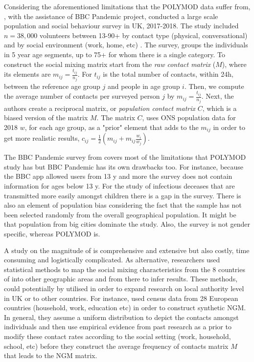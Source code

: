 \documentclass[12pt]{article}
\begin{document}
Considering the aforementioned limitations that the POLYMOD data suffer from, \cite{Klepac2020}, with the assistance of BBC Pandemic project, conducted a large scale population and social behaviour survey in UK, 2017-2018. The study included $n=38,000$ volunteers between 13-90+ by contact type (physical, conversational) and by social environment (work, home, etc) . The survey, groups the individuals in 5 year age segments, up to 75+ for whom there is a single category. To construct the social mixing matrix \cite{Klepac2020} start from the \textit{raw contact matrix} ($M$), where its elements are $m_{ij}=\frac{t_{ij}}{n_{j}}$. For $t_{ij}$ is the total number of contacts, within 24h, between the reference age group $j$ and people in age group $i$. Then, we compute the average number of contacts per surveyed person $j$ by $m_{ij}=\frac{t_{ij}}{n_{j}}$. Next, the authors create a reciprocal matrix, or \textit{population contact matrix} $C$, which is a biased version of the matrix $M$. The matrix $C$, uses ONS population data for 2018 $w$, for each age group, as a "prior" element that adds to the $m_{ij}$ in order to get more realistic results, $c_{ij}=\frac{1}{2}(m_{ij} + m_{ij}\frac{w_{i}}{w_{j}})$. 

The BBC Pandemic survey from \cite{Klepac2020} covers most of the limitations that POLYMOD study \cite{Diekmann:2010} has but BBC Pandemic has its own drawbacks too. For instance, because the BBC app allowed users from 13 y and more the survey does not contain information for ages below 13 y. For the study of infectious deceases that are transmitted more easily amongst children there is a gap in the survey. There is also an element of population bias considering the fact that the sample has not been selected randomly from the overall geographical population. It might be that population from big cities dominate the study. Also, the survey is not gender specific, whereas POLYMOD is. 

A study on the magnitude of \cite{Klepac2020} is comprehensive and extensive but also costly, time consuming and logistically complicated. As alternative, researchers used statistical methods to map the social mixing characteristics from the 8 countries of \cite{Diekmann:2010} into other geographic areas and from there to infer results. These methods, could potentially by utilised in order to expand research on local authority level in UK or to other countries. For instance, \cite{Fumanelli:2012} used census data from 28 European countries (household, work, education etc) in order to construct synthetic NGM. In general, they assume a uniform distribution to depict the contacts amongst individuals and then use empirical evidence from past research as a prior to modify these contact rates according to the social setting (work, household, school, etc) before they construct the average frequency of contacts matrix $M$ that leads to the NGM matrix.
\end{document}
